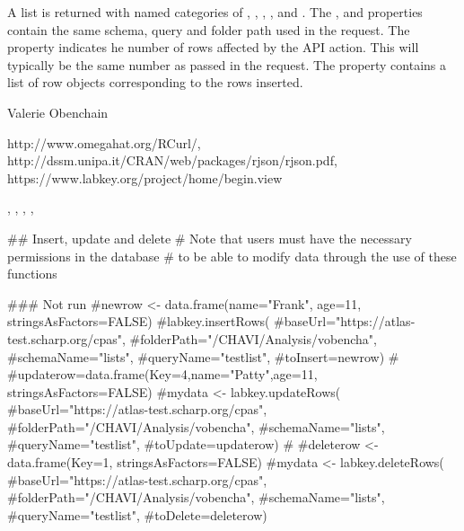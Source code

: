 \documentclass{book}
\begin{document}
\begin{Value}
A list is returned with named categories of , , , ,  and .
The ,  and  properties contain the same schema, query 
and folder path used in the request.  The
 property indicates he number of rows affected by the API action. This will typically be the same
number as passed in the request. The  property contains a list of row objects corresponding to the rows 
inserted.
\end{Value}
\begin{Author}\relax
Valerie Obenchain
\end{Author}
\begin{References}\relax
http://www.omegahat.org/RCurl/,\\ 
http://dssm.unipa.it/CRAN/web/packages/rjson/rjson.pdf,\\
https://www.labkey.org/project/home/begin.view
\end{References}
\begin{SeeAlso}\relax
{}, , , 
, 
\end{SeeAlso}
\begin{Examples}
\begin{ExampleCode}

## Insert, update and delete
# Note that users must have the necessary permissions in the database
# to be able to modify data through the use of these functions

### Not run
#newrow <- data.frame(name="Frank", age=11, stringsAsFactors=FALSE)
#labkey.insertRows(
#baseUrl="https://atlas-test.scharp.org/cpas", 
#folderPath="/CHAVI/Analysis/vobencha", 
#schemaName="lists", 
#queryName="testlist", 
#toInsert=newrow)
#
#updaterow=data.frame(Key=4,name="Patty",age=11, stringsAsFactors=FALSE)
#mydata <- labkey.updateRows(
#baseUrl="https://atlas-test.scharp.org/cpas", 
#folderPath="/CHAVI/Analysis/vobencha", 
#schemaName="lists", 
#queryName="testlist", 
#toUpdate=updaterow)
#
#deleterow <- data.frame(Key=1, stringsAsFactors=FALSE)
#mydata <- labkey.deleteRows(
#baseUrl="https://atlas-test.scharp.org/cpas", 
#folderPath="/CHAVI/Analysis/vobencha", 
#schemaName="lists", 
#queryName="testlist", 
#toDelete=deleterow)

\end{ExampleCode}
\end{Examples}
\end{document}
